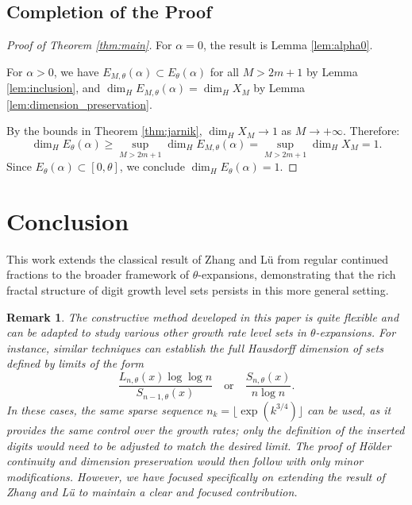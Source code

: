 \documentclass{article}
\newtheorem{remark}[theorem]{Remark}
\numberwithin{equation}{section}
\begin{document}
\subsection{Completion of the Proof}

\begin{proof}[Proof of Theorem \ref{thm:main}]
For $\alpha = 0$, the result is Lemma \ref{lem:alpha0}.

For $\alpha > 0$, we have
$E_{M,\theta}(\alpha) \subset E_\theta(\alpha)$ for all $M > 2m+1$ by Lemma \ref{lem:inclusion},
and $\dim_H E_{M,\theta}(\alpha) = \dim_H X_M$ by Lemma \ref{lem:dimension_preservation}.

{By the bounds in Theorem \ref{thm:jarnik}, $\dim_H X_M \to 1$ as $M \to +\infty$.}
Therefore:
\[
\dim_H E_\theta(\alpha) \geq \sup_{M > 2m+1} \dim_H E_{M,\theta}(\alpha) = \sup_{M > 2m+1} \dim_H X_M = 1.
\]
Since $E_\theta(\alpha) \subset [0, \theta]$, we conclude $\dim_H E_\theta(\alpha) = 1$.
\end{proof}




 


\section{Conclusion}

This work extends the classical result of Zhang and Lü \cite{ZhangLu} from regular continued fractions to the broader framework of $\theta$-expansions, demonstrating that the rich fractal structure of digit growth level sets persists in this more general setting.

\begin{remark}
The constructive method developed in this paper is quite flexible and can be adapted to study various other growth rate level sets in $\theta$-expansions. For instance, similar techniques can establish the full Hausdorff dimension of sets defined by limits of the form
\[
\frac{L_{n,\theta}(x) \log \log n}{S_{n-1,\theta}(x)} \quad \text{or} \quad \frac{S_{n,\theta}(x)}{n \log n}.
\]
In these cases, the same sparse sequence \(n_k = \lfloor\exp(k^{3/4})\rfloor\) can be used, as it provides the same control over the growth rates; only the definition of the inserted digits would need to be adjusted to match the desired limit. The proof of Hölder continuity and dimension preservation would then follow with only minor modifications.
However, we have focused specifically on extending the result of Zhang and Lü to maintain a clear and focused contribution.
\end{remark}
\end{document}

